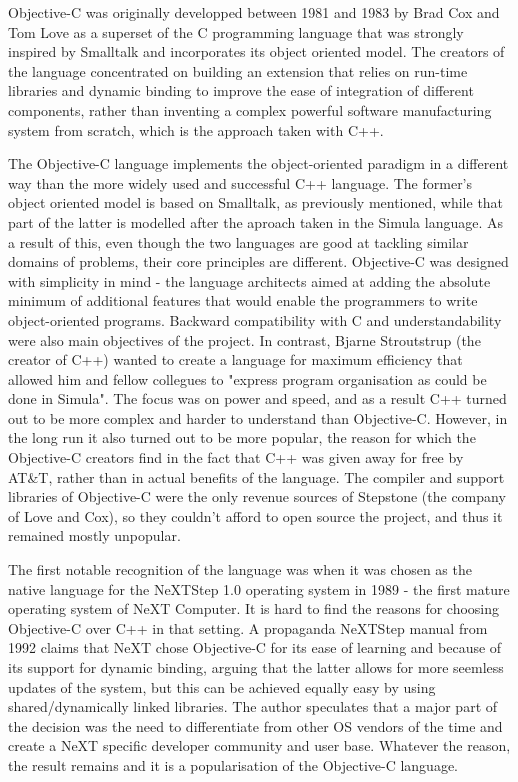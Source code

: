 \documentclass[parskip]{cs4rep}
\begin{document}
Objective-C was originally developped between 1981 and 1983 by Brad Cox and Tom Love as a superset of the C programming language that was strongly inspired by Smalltalk and incorporates its object oriented model\cite{Biancuzzi2009}. The creators of the language concentrated on building an extension that relies on run-time libraries and dynamic binding to improve the ease of integration of different components, rather than inventing a complex powerful software manufacturing system from scratch, which is the approach taken with C++.

The Objective-C language implements the object-oriented paradigm in a different way than the more widely used and successful C++ language. The former's object oriented model is based on Smalltalk, as previously mentioned, while that part of the latter is modelled after the aproach taken in the Simula language. As a result of this, even though the two languages are good at tackling similar domains of problems, their core principles are different. Objective-C was designed with simplicity in mind - the language architects aimed at adding the absolute minimum of additional features that would enable the programmers to write object-oriented programs. Backward compatibility with C and understandability were also main objectives of the project. In contrast, Bjarne Stroutstrup (the creator of C++) wanted to create a language for maximum efficiency that allowed him and fellow collegues to "express program organisation as could be done in Simula"\cite{Biancuzzi2009}. The focus was on power and speed, and as a result C++ turned out to be more complex and harder to understand than Objective-C. However, in the long run it also turned out to be more popular, the reason for which the Objective-C creators find in the fact that C++ was given away for free by AT\&T, rather than in actual benefits of the language. The compiler and support libraries of Objective-C were the only revenue sources of Stepstone (the company of Love and Cox), so they couldn't afford to open source the project, and thus it remained mostly unpopular.

The first notable recognition of the language was when it was chosen as the native language for the NeXTStep 1.0 operating system in 1989 - the first mature operating system of NeXT Computer. It is hard to find the reasons for choosing Objective-C over C++ in that setting. A propaganda NeXTStep manual from 1992\cite{NeXTCorporation1991} claims that NeXT chose Objective-C for its ease of learning and because of its support for dynamic binding, arguing that the latter allows for more seemless updates of the system, but this can be achieved equally easy by using shared/dynamically linked libraries. The author speculates that a major part of the decision was the need to differentiate from other OS vendors of the time and create a NeXT specific developer community and user base. Whatever the reason, the result remains and it is a popularisation of the Objective-C language.
\end{document}
